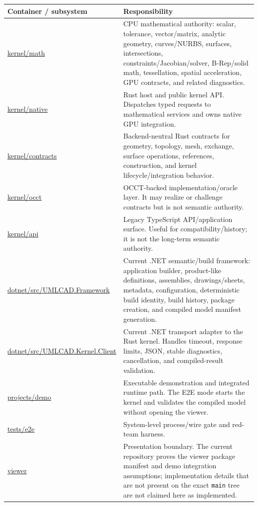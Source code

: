 \documentclass[11pt,a4paper]{report}
\newcommand{\pathref}[1]{\url{#1}}
\begin{document}
\begin{tabularx}{\textwidth}{@{}p{}X@{}}
\toprule
Container / subsystem & Responsibility \\
\midrule
\pathref{kernel/math} & CPU mathematical authority: scalar, tolerance, vector/matrix, analytic geometry, curves/NURBS, surfaces, intersections, constraints/Jacobian/solver, B-Rep/solid math, tessellation, spatial acceleration, GPU contracts, and related diagnostics. \\
\pathref{kernel/native} & Rust host and public kernel API. Dispatches typed requests to mathematical services and owns native GPU integration. \\
\pathref{kernel/contracts} & Backend-neutral Rust contracts for geometry, topology, mesh, exchange, surface operations, references, construction, and kernel lifecycle/integration behavior. \\
\pathref{kernel/occt} & OCCT-backed implementation/oracle layer. It may realize or challenge contracts but is not semantic authority. \\
\pathref{kernel/api} & Legacy TypeScript API/application surface. Useful for compatibility/history; it is not the long-term semantic authority. \\
\pathref{dotnet/src/UMLCAD.Framework} & Current .NET semantic/build framework: application builder, product-like definitions, assemblies, drawings/sheets, metadata, configuration, deterministic build identity, build history, package creation, and compiled model manifest generation. \\
\pathref{dotnet/src/UMLCAD.Kernel.Client} & Current .NET transport adapter to the Rust kernel. Handles timeout, response limits, JSON, stable diagnostics, cancellation, and compiled-result validation. \\
\pathref{projects/demo} & Executable demonstration and integrated runtime path. The E2E mode starts the kernel and validates the compiled model without opening the viewer. \\
\pathref{tests/e2e} & System-level process/wire gate and red-team harness. \\
\pathref{viewer} & Presentation boundary. The current repository proves the viewer package manifest and demo integration assumptions; implementation details that are not present on the exact \texttt{main} tree are not claimed here as implemented. \\
\bottomrule

\end{tabularx}
\end{document}
